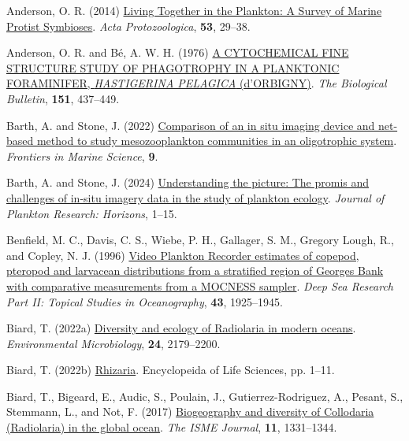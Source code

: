 \documentclass[
]{article}
\newlength{\cslhangindent}
\newlength{\cslentryspacingunit} %
\newenvironment{CSLReferences}[2] %
 {%
  \setlength{\parindent}{0pt}
  \ifodd #1
  \let\oldpar\par
  \def\par{\hangindent=\cslhangindent\oldpar}
  \fi
  \setlength{\parskip}{#2\cslentryspacingunit}
 }%
 {}
\begin{document}
\hypertarget{refs}{}
\begin{CSLReferences}{1}{0}
\leavevmode{}%
Anderson, O. R. (2014)
\href{https://doi.org/10.4467/16890027AP.13.0019.1116}{Living Together
in the Plankton: A Survey of Marine Protist Symbioses}. \emph{Acta
Protozoologica}, \textbf{53}, 29--38.

\leavevmode{}%
Anderson, O. R. and Bé, A. W. H. (1976)
\href{https://doi.org/10.2307/1540498}{A CYTOCHEMICAL FINE STRUCTURE
STUDY OF PHAGOTROPHY IN A PLANKTONIC FORAMINIFER, {\emph{HASTIGERINA
PELAGICA}} (d'ORBIGNY)}. \emph{The Biological Bulletin}, \textbf{151},
437--449.

\leavevmode{}%
Barth, A. and Stone, J. (2022)
\href{https://www.frontiersin.org/articles/10.3389/fmars.2022.898057}{Comparison
of an in situ imaging device and net-based method to study
mesozooplankton communities in an oligotrophic system}. \emph{Frontiers
in Marine Science}, \textbf{9}.

\leavevmode{}%
Barth, A. and Stone, J. (2024)
\href{https://doi.org/10.1093/plankt/fbae023}{Understanding the picture:
The promis and challenges of in-situ imagery data in the study of
plankton ecology}. \emph{Journal of Plankton Research: Horizons}, 1--15.

\leavevmode{}%
Benfield, M. C., Davis, C. S., Wiebe, P. H., Gallager, S. M., Gregory
Lough, R., and Copley, N. J. (1996)
\href{https://doi.org/10.1016/S0967-0645(96)00044-6}{Video Plankton
Recorder estimates of copepod, pteropod and larvacean distributions from
a stratified region of Georges Bank with comparative measurements from a
MOCNESS sampler}. \emph{Deep Sea Research Part II: Topical Studies in
Oceanography}, \textbf{43}, 1925--1945.

\leavevmode{}%
Biard, T. (2022a)
\href{https://doi.org/10.1111/1462-2920.16004}{Diversity and ecology of
Radiolaria in modern oceans}. \emph{Environmental Microbiology},
\textbf{24}, 2179--2200.

\leavevmode{}%
Biard, T. (2022b)
\href{https://doi.org/10.1002/9780470015902.a0029469}{Rhizaria}.
Encyclopeida of Life Sciences, pp. 1--11.

\leavevmode{}%
Biard, T., Bigeard, E., Audic, S., Poulain, J., Gutierrez-Rodriguez, A.,
Pesant, S., Stemmann, L., and Not, F. (2017)
\href{https://doi.org/10.1038/ismej.2017.12}{Biogeography and diversity
of Collodaria (Radiolaria) in the global ocean}. \emph{The ISME
Journal}, \textbf{11}, 1331--1344.


\end{CSLReferences}
\end{document}
